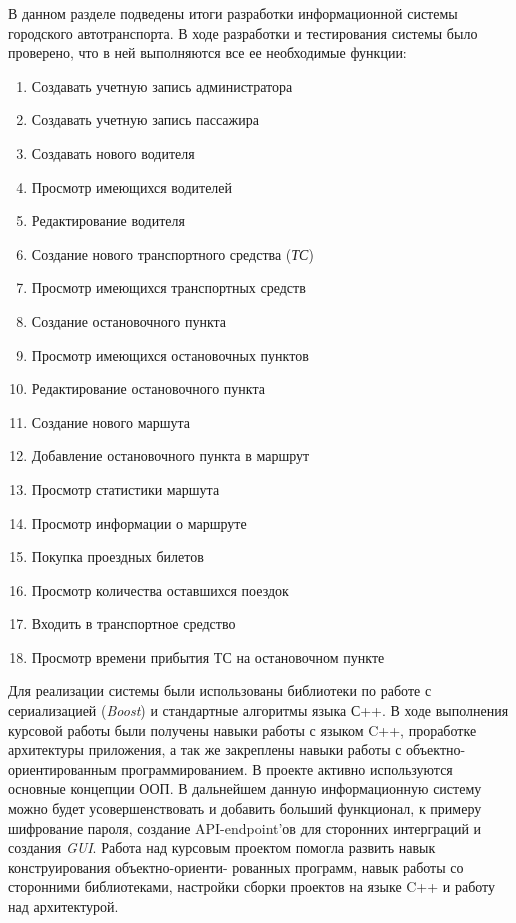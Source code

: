 
	В данном разделе подведены итоги разработки информационной системы городского автотранспорта.
В ходе разработки и тестирования системы было проверено, что в ней выполняются все ее необходимые функции:
\begin{enumerate}
    \item Создавать учетную запись администратора
    \item Создавать учетную запись пассажира
    \item Создавать нового водителя
    \item Просмотр имеющихся водителей
    \item Редактирование водителя
    \item Создание нового транспортного средства (\textit{ТС})
    \item Просмотр имеющихся транспортных средств
    \item Создание остановочного пункта
    \item Просмотр имеющихся остановочных пунктов
    \item Редактирование остановочного пункта
    \item Создание нового маршута
    \item Добавление остановочного пункта в маршрут
    \item Просмотр статистики маршута
    \item Просмотр информации о маршруте
    \item Покупка проездных билетов
    \item Просмотр количества оставшихся поездок
    \item Входить в транспортное средство
    \item Просмотр времени прибытия ТС на остановочном пункте
\end{enumerate}

Для реализации системы были использованы библиотеки по работе с сериализацией (\textit{Boost}) и стандартные алгоритмы языка С++.
В ходе выполнения курсовой работы были получены навыки работы с языком C++, проработке архитектуры приложения, а так же закреплены навыки работы с объектно-ориентированным программированием. В проекте активно используются основные концепции ООП.
В дальнейшем данную информационную систему можно будет усовершенствовать и добавить больший функционал, к примеру шифрование пароля, создание API-endpoint'ов для сторонних интерграций и создания \textit{GUI}.
Работа над курсовым проектом помогла развить навык конструирования объектно-ориенти-
рованных программ, навык работы со сторонними библиотеками, настройки сборки проектов на языке C++ и работу над архитектурой. 